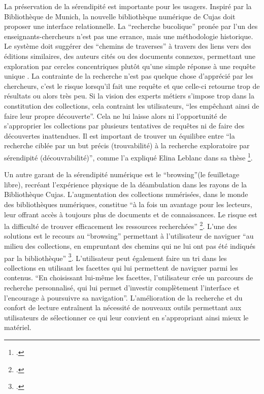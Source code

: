 La préservation de la sérendipité est importante pour les usagers. Inspiré par la Bibliothèque de Munich, la nouvelle bibliothèque numérique de Cujas doit proposer une interface relationnelle. La \enquote{recherche bucolique} pronée par l'un des enseignants-chercheurs n'est pas une errance, mais une méthodologie historique. Le système doit suggérer des \enquote{chemins de traverses} à travers des liens vers des éditions similaires, des auteurs cités ou des documents connexes, permettant une exploration par cercles concentriques plutôt qu'une simple réponse à une requête unique . La contrainte de la recherche n'est pas quelque chose d'apprécié par les chercheurs, c'est le risque lorsqu'il fait une requête et que celle-ci retourne trop de résultats ou alors très peu. Si la vision des experts métiers s'impose trop dans la constitution des collections, cela contraint les utilisateurs, \enquote{les empêchant ainsi de faire leur propre découverte}. Cela ne lui laisse alors ni l'opportunité de s'approprier les collections par plusieurs tentatives de requêtes ni de faire des découvertes inattendues. Il est important de trouver un équilibre entre \enquote{la recherche ciblée par un but précis (trouvabilité) à la recherche exploratoire par sérendipité (découvrabilité)}, comme l'a expliqué Elina Leblanc dans sa thèse \footcite{leblancBibliothequesNumeriquesEnrichies}. 

Un autre garant de la sérendipité numérique est le \enquote{browsing}(le feuilletage libre), recréant l'expérience physique de la déambulation dans les rayons de la Bibliothèque Cujas. L'augmentation des collections numérisées, dans le monde des bibliothèques numériques, constitue \enquote{à la fois un avantage pour les lecteurs, leur offrant accès à toujours plus de documents et de connaissances. Le risque est la difficulté de trouver efficacement les ressources recherchées} \footcite{leblancBibliothequesNumeriquesEnrichies}. L'une des solutions est le recours au \enquote{browsing} permettant à l'utilisateur de naviguer \enquote{au milieu des collections, en empruntant des chemins qui ne lui ont pas été indiqués par la bibliothèque} \footcite{leblancBibliothequesNumeriquesEnrichies}. L'utilisateur peut également faire un tri dans les collections en utilisant les facettes qui lui permettent de naviguer parmi les contenus. \enquote{En choisissant lui-même les facettes, l'utilisateur crée un parcours de recherche personnalisé, qui lui permet d'investir complètement l'interface et l'encourage à poursuivre sa navigation}. L'amélioration de la recherche et du confort de lecture entraînent la nécessité de nouveaux outils permettant aux utilisateurs de sélectionner ce qui leur convient en s'appropriant ainsi mieux le matériel. 
